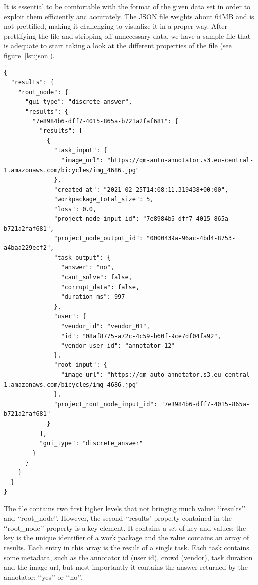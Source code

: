 \documentclass[letterpaper,12pt]{article}
\begin{document}
It is essential to be comfortable with the format of the given data set in order to exploit them efficiently and accurately. The JSON file weights about 64MB and is not prettified, making it challenging to visualize it in a proper way.
After prettifying the file and stripping off unnecessary data, we have a sample file that is adequate to start taking a look at the different properties of the file (see
figure~\ref{lst:json}).
\renewcommand{\lstlistingname}{Figure}
\renewcommand{\thelstlisting}{2}
\begin{lstlisting}[caption={Content of a prettified sample of the JSON file},captionpos=b,label={lst:json}]
{
  "results": {
    "root_node": {
      "gui_type": "discrete_answer",
      "results": {
        "7e8984b6-dff7-4015-865a-b721a2faf681": {
          "results": [
            {
              "task_input": {
                "image_url": "https://qm-auto-annotator.s3.eu-central-1.amazonaws.com/bicycles/img_4686.jpg"
              },
              "created_at": "2021-02-25T14:08:11.319438+00:00",
              "workpackage_total_size": 5,
              "loss": 0.0,
              "project_node_input_id": "7e8984b6-dff7-4015-865a-b721a2faf681",
              "project_node_output_id": "0000439a-96ac-4bd4-8753-a4baa229ecf2",
              "task_output": {
                "answer": "no",
                "cant_solve": false,
                "corrupt_data": false,
                "duration_ms": 997
              },
              "user": {
                "vendor_id": "vendor_01",
                "id": "08af8775-a72c-4c59-b60f-9ce7df04fa92",
                "vendor_user_id": "annotator_12"
              },
              "root_input": {
                "image_url": "https://qm-auto-annotator.s3.eu-central-1.amazonaws.com/bicycles/img_4686.jpg"
              },
              "project_root_node_input_id": "7e8984b6-dff7-4015-865a-b721a2faf681"
            }
          ],
          "gui_type": "discrete_answer"
        }
      }
    }
  }
}
\end{lstlisting}

The file contains two first higher levels that not bringing much value: ‘‘results’’ and ‘‘root\_node’’. However, the second ‘‘results" property contained in the ‘‘root\_node’’ property is a key element. It contains a set of key and values: the key is the unique identifier of a work package and the value contains an array of results. Each entry in this array is the result of a single task. Each task contains some metadata, such as the annotator id (user id), crowd (vendor), task duration and the image url, but most importantly it contains the answer returned by the annotator: ‘‘yes’’ or ‘‘no’’.
\end{document}
